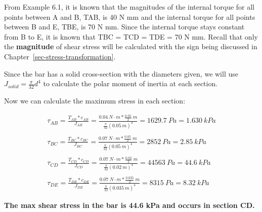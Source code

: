\documentclass[
  letterpaper,
  DIV=11,
  numbers=noendperiod]{scrreprt}
\theoremstyle{definition}
\theoremstyle{remark}
\begin{document}
\begin{tcolorbox}
\begin{tcolorbox}
From Example 6.1, it is known that the magnitudes of the internal torque
for all points between A and B, TAB, is 40 N mm and the internal torque
for all points between B and E, TBE, is 70 N mm. Since the internal
torque stays constant from B to E, it is known that TBC = TCD = TDE = 70
N mm. Recall that only the \textbf{magnitude} of shear stress will be
calculated with the sign being discussed in
Chapter~\ref{sec-stress-transformation}.

Since the bar has a solid cross-section with the diameters given, we
will use \(J_{solid}=\frac{\pi}{32} d^4\) to calculate the polar moment
of inertia at each section.

Now we can calculate the maximum stress in each section:

\[
\begin{gathered}
\tau_{AB}=\frac{T_{AB}*c_{AB}}{J_{AB}}=\frac{0.04{~N}\cdot{m}*\frac{0.05}{2} {~m}} {\frac{\pi}{32}(0.05{~m})^4}=1629.7{~Pa}=1.630{~kPa} \\
\\
\tau_{BC}=\frac{T_{BC}*c_{BC}}{J_{BC}}=\frac{0.07{~N}\cdot{m}*\frac{0.05}{2}{~m}}{\frac{\pi}{32}(0.05{~m})^4}=2852{~Pa}=2.85{~kPa} \\
\\
\tau_{CD}=\frac{T_{CD}*c_{CD}}{J_{CD}}=\frac{0.07{~N}\cdot{m}*\frac{0.02}{2}~{m}}{\frac{\pi}{32}(0.02{~m})^4}=44563{~Pa}=44.6{~kPa} \\
\\
\tau_{DE}=\frac{T_{DE}*c_{DE}}{J_{DE}}=\frac{0.07{~N}\cdot{m}*\frac{0.035}{2}{~m}}{\frac{\pi}{32}(0.035{~m})^4}=8315{~Pa}=8.32{~kPa}
\end{gathered}
\]

\textbf{The max shear stress in the bar is 44.6 kPa and occurs in
section CD.}

\end{tcolorbox}

\end{tcolorbox}
\end{document}
